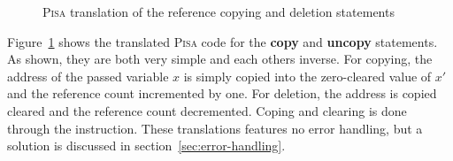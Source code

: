\begin{figure}[ht]
\begin{subfigure}[t]{0.495\linewidth}
    \end{subfigure}
    
    \caption{\textsc{Pisa} translation of the reference copying and deletion statements}
    \label{fig:pisa-referencing}
\end{figure}

Figure~\ref{fig:pisa-referencing} shows the translated \textsc{Pisa} code for the \textbf{copy} and \textbf{uncopy} statements. As shown, they are both very simple and each others inverse. For copying, the address of the passed variable $x$ is simply copied into the zero-cleared value of $x'$ and the reference count incremented by one. For deletion, the address is copied cleared and the reference count decremented. Coping and clearing is done through the  instruction. These translations features no error handling, but a solution is discussed in section~\ref{sec:error-handling}.


